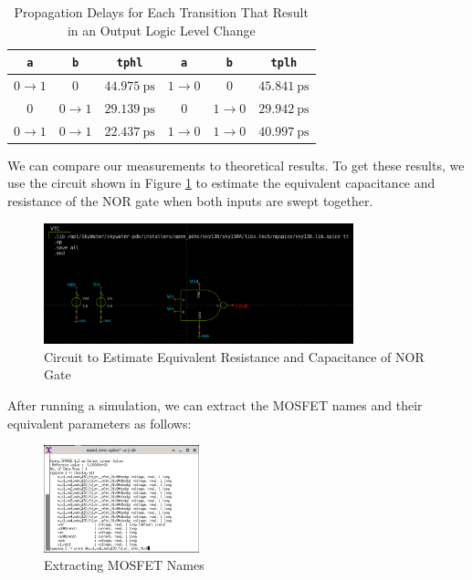 \documentclass[fleqn]{article}
\begin{document}
	\begin{table}[H]
	\begin{center}
	\caption{Propagation Delays for Each Transition That Result in an Output Logic Level Change}
	\label{table::nor_gate_delay_analysis}
	\begin{tabular}{| c | c | c || c | c | c |}
		\hline
		\texttt{a} & \texttt{b} & \texttt{tphl} & \texttt{a} & \texttt{b} & \texttt{tplh} \\
		\hline	
		$0 \rightarrow 1$ & $0$ & $44.975\ \text{ps}$ & $1 \rightarrow 0$ & $0$ & $45.841\ \text{ps}$\\
		\hline	
		$0$ & $0 \rightarrow 1$ & $29.139\ \text{ps}$ & $0$ & $1 \rightarrow 0$ & $29.942\ \text{ps}$\\
		\hline	
		$0 \rightarrow 1$ & $0 \rightarrow 1$ & $22.437\ \text{ps}$ & $1 \rightarrow 0$ & $1 \rightarrow 0$ & $40.997\ \text{ps}$\\
		\hline
	\end{tabular}
	\end{center}
	\end{table}
	
	We can compare our measurements to theoretical results. To get these results, we use the circuit shown in Figure \ref{fig::nor_eq_test_sweep_va_vb} to estimate the equivalent capacitance and resistance of the NOR gate when both inputs are swept together.
	
	\begin{figure}[H]
		\centerline{\includegraphics[width=0.8\textwidth]{nand_eq_test_sweep_va_vb.png}}
		\caption{Circuit to Estimate Equivalent Resistance and Capacitance of NOR Gate}
		\label{fig::nor_eq_test_sweep_va_vb}
	\end{figure}
	
	\noindent After running a simulation, we can extract the MOSFET names and their equivalent parameters as follows:
	
	\begin{figure}[H]
		\centerline{\includegraphics[width=0.4\textwidth]{nand_eq_display_sweep_va_vb.png}}
		\caption{Extracting MOSFET Names}
		\label{fig::nor_eq_display_sweep_va_vb}
	\end{figure}
	
\end{document}
